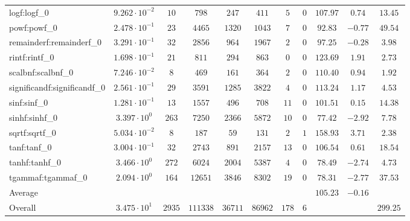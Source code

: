 \begin{tabular}{|l|c|c|c|c|c|c|c|c|c|c|}
logf:logf\_0                 & $ 9.262 \cdot 10^{-2} $ & $ 10     $ & $ 798    $ & $ 247   $ & $ 411   $ & $ 5   $ & $ 0 $ & $ 107.97      $ & $ 0.74    $ & $ 13.45   $ \\
powf:powf\_0                 & $ 2.478 \cdot 10^{-1} $ & $ 23     $ & $ 4465   $ & $ 1320  $ & $ 1043  $ & $ 7   $ & $ 0 $ & $ 92.83       $ & $ -0.77   $ & $ 49.54   $ \\
remainderf:remainderf\_0     & $ 3.291 \cdot 10^{-1} $ & $ 32     $ & $ 2856   $ & $ 964   $ & $ 1967  $ & $ 2   $ & $ 0 $ & $ 97.25       $ & $ -0.28   $ & $ 3.98    $ \\
rintf:rintf\_0               & $ 1.698 \cdot 10^{-1} $ & $ 21     $ & $ 811    $ & $ 294   $ & $ 863   $ & $ 0   $ & $ 0 $ & $ 123.69      $ & $ 1.91    $ & $ 2.73    $ \\
scalbnf:scalbnf\_0           & $ 7.246 \cdot 10^{-2} $ & $ 8      $ & $ 469    $ & $ 161   $ & $ 364   $ & $ 2   $ & $ 0 $ & $ 110.40      $ & $ 0.94    $ & $ 1.92    $ \\
significandf:significandf\_0 & $ 2.561 \cdot 10^{-1} $ & $ 29     $ & $ 3591   $ & $ 1285  $ & $ 3822  $ & $ 4   $ & $ 0 $ & $ 113.24      $ & $ 1.17    $ & $ 4.53    $ \\
sinf:sinf\_0                 & $ 1.281 \cdot 10^{-1} $ & $ 13     $ & $ 1557   $ & $ 496   $ & $ 708   $ & $ 11  $ & $ 0 $ & $ 101.51      $ & $ 0.15    $ & $ 14.38   $ \\
sinhf:sinhf\_0               & $ 3.397 \cdot 10^{0}  $ & $ 263    $ & $ 7250   $ & $ 2366  $ & $ 5872  $ & $ 10  $ & $ 0 $ & $ 77.42       $ & $ -2.92   $ & $ 7.78    $ \\
sqrtf:sqrtf\_0               & $ 5.034 \cdot 10^{-2} $ & $ 8      $ & $ 187    $ & $ 59    $ & $ 131   $ & $ 2   $ & $ 1 $ & $ 158.93      $ & $ 3.71    $ & $ 2.38    $ \\
tanf:tanf\_0                 & $ 3.004 \cdot 10^{-1} $ & $ 32     $ & $ 2743   $ & $ 891   $ & $ 2157  $ & $ 13  $ & $ 0 $ & $ 106.54      $ & $ 0.61    $ & $ 18.54   $ \\
tanhf:tanhf\_0               & $ 3.466 \cdot 10^{0}  $ & $ 272    $ & $ 6024   $ & $ 2004  $ & $ 5387  $ & $ 4   $ & $ 0 $ & $ 78.49       $ & $ -2.74   $ & $ 4.73    $ \\
tgammaf:tgammaf\_0           & $ 2.094 \cdot 10^{0}  $ & $ 164    $ & $ 12651  $ & $ 3846  $ & $ 8302  $ & $ 19  $ & $ 0 $ & $ 78.31       $ & $ -2.77   $ & $ 37.53   $ \\
\hline
Average                      & $                     $ & $        $ & $        $ & $       $ & $       $ & $     $ & $   $ & $ 105.23      $ & $ -0.16   $ & $         $ \\
\hline
Overall                      & $ 3.475 \cdot 10^{1}  $ & $ 2935   $ & $ 111338 $ & $ 36711 $ & $ 86962 $ & $ 178 $ & $ 6 $ & $             $ & $         $ & $ 299.25  $ \\
\hline
\end{tabular}
